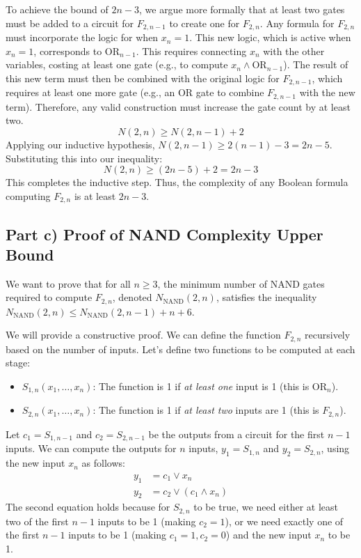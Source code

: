 \documentclass{solutionclass} %
\begin{document}
To achieve the bound of $2n-3$, we argue more formally that at least two gates must be added to a circuit for $F_{2,n-1}$ to create one for $F_{2,n}$. Any formula for $F_{2,n}$ must incorporate the logic for when $x_n=1$. This new logic, which is active when $x_n=1$, corresponds to $\text{OR}_{n-1}$. This requires connecting $x_n$ with the other variables, costing at least one gate (e.g., to compute $x_n \land \text{OR}_{n-1}$). The result of this new term must then be combined with the original logic for $F_{2,n-1}$, which requires at least one more gate (e.g., an OR gate to combine $F_{2,n-1}$ with the new term). Therefore, any valid construction must increase the gate count by at least two.
\begin{equation}
    N(2,n) \ge N(2, n-1) + 2
\end{equation}
Applying our inductive hypothesis, $N(2,n-1) \ge 2(n-1) - 3 = 2n - 5$.
Substituting this into our inequality:
\begin{equation}
    N(2,n) \ge (2n - 5) + 2 = 2n - 3
\end{equation}
This completes the inductive step. Thus, the complexity of any Boolean formula computing $F_{2,n}$ is at least $2n-3$.

\subsection{Part c) Proof of NAND Complexity Upper Bound}
We want to prove that for all $n \geq 3$, the minimum number of NAND gates required to compute $F_{2,n}$, denoted $N_{\text{NAND}}(2, n)$, satisfies the inequality $N_{\text{NAND}}(2, n) \leq N_{\text{NAND}}(2, n - 1) + n + 6$.

We will provide a constructive proof. We can define the function $F_{2,n}$ recursively based on the number of inputs. Let's define two functions to be computed at each stage:
\begin{itemize}
    \item $S_{1,n}(x_1, \dots, x_n)$: The function is 1 if \emph{at least one} input is 1 (this is $\text{OR}_n$).
    \item $S_{2,n}(x_1, \dots, x_n)$: The function is 1 if \emph{at least two} inputs are 1 (this is $F_{2,n}$).
\end{itemize}
Let $c_1 = S_{1,n-1}$ and $c_2 = S_{2,n-1}$ be the outputs from a circuit for the first $n-1$ inputs. We can compute the outputs for $n$ inputs, $y_1 = S_{1,n}$ and $y_2 = S_{2,n}$, using the new input $x_n$ as follows:
\begin{align}
    y_1 &= c_1 \lor x_n \\
    y_2 &= c_2 \lor (c_1 \land x_n)
\end{align}
The second equation holds because for $S_{2,n}$ to be true, we need either at least two of the first $n-1$ inputs to be 1 (making $c_2=1$), or we need exactly one of the first $n-1$ inputs to be 1 (making $c_1=1, c_2=0$) and the new input $x_n$ to be 1.
\end{document}
